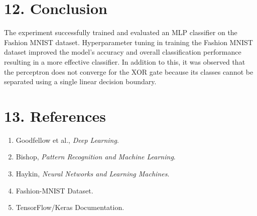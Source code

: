 \documentclass[11pt]{article}
\begin{document}
\section*{12. Conclusion}
The experiment successfully trained and evaluated an MLP classifier on the Fashion MNIST dataset.
Hyperparameter tuning in training the Fashion MNIST dataset improved the model's accuracy and overall classification performance resulting in a more effective classifier.
In addition to this, it was observed that the perceptron does not converge for the XOR gate because its classes cannot be separated using a single linear decision boundary.


\section*{13. References}
\begin{enumerate}
\item Goodfellow et al., \emph{Deep Learning}.
\item Bishop, \emph{Pattern Recognition and Machine Learning}.
\item Haykin, \emph{Neural Networks and Learning Machines}.
\item Fashion-MNIST Dataset.
\item TensorFlow/Keras Documentation.
\end{enumerate}
\end{document}

